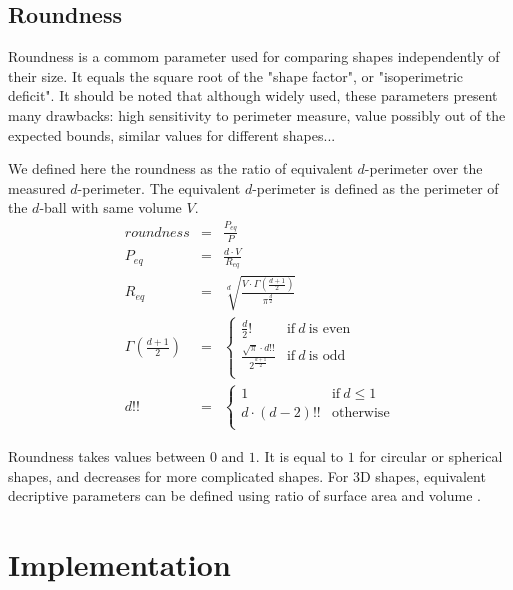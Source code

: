 \documentclass{InsightArticle}
\begin{document}
\subsection{Roundness}

Roundness is a commom parameter used for comparing shapes independently of their size.
It equals the square root of the "shape factor", or "isoperimetric deficit".
It should be noted that although widely used, these parameters present many drawbacks: 
high sensitivity to perimeter measure, 
value possibly out of the expected bounds, similar values for different shapes\cite{Pirard2005}...

We defined here the roundness as the ratio of equivalent $d$-perimeter over the measured $d$-perimeter. 
The equivalent $d$-perimeter is defined as the perimeter of the $d$-ball with same volume $V$.
\begin{eqnarray}
roundness             & = & \frac{P_{eq}}{P} \\
P_{eq}                & = & \frac{d \cdot V}{R_{eq}} \\
R_{eq}                & = & \sqrt[\displaystyle d]{\frac{V\cdot\Gamma(\frac{d+1}{2})}{\pi^\frac{d}{2}}} \\
\Gamma(\frac{d+1}{2}) & = & \begin{cases}
                               \displaystyle \frac{d}{2}!  &\text{if}~ d ~\text{is even} \\
                               \displaystyle \frac{\sqrt{\pi} \cdot d!!}{2^{\frac{d+1}{2}}}  &\text{if}~ d ~\text{is odd} \\
                            \end{cases} \\
d!!                   & = & \begin{cases}
                                1 &\text{if}~ d \leq 1 \\
                                d \cdot (d-2)!!  & \text{otherwise} \\
                             \end{cases}
\end{eqnarray}


Roundness takes values between $0$ and $1$. 
It is equal to $1$ for circular or spherical shapes, and decreases for more complicated shapes.
For 3D shapes, equivalent decriptive parameters can be defined using ratio of surface area and volume \cite{Andrey2010}.


\section{Implementation}
\end{document}
